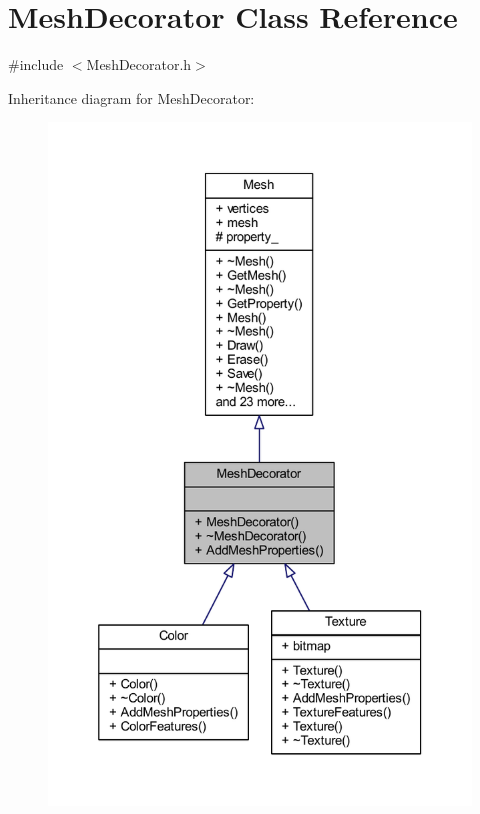 \hypertarget{class_mesh_decorator}{}\section{Mesh\+Decorator Class Reference}
\label{class_mesh_decorator}


{\ttfamily \#include $<$Mesh\+Decorator.\+h$>$}



Inheritance diagram for Mesh\+Decorator\+:\nopagebreak
\begin{figure}[H]
\begin{center}
\leavevmode
\includegraphics[width=332pt]{class_mesh_decorator__inherit__graph}
\end{center}
\end{figure}


